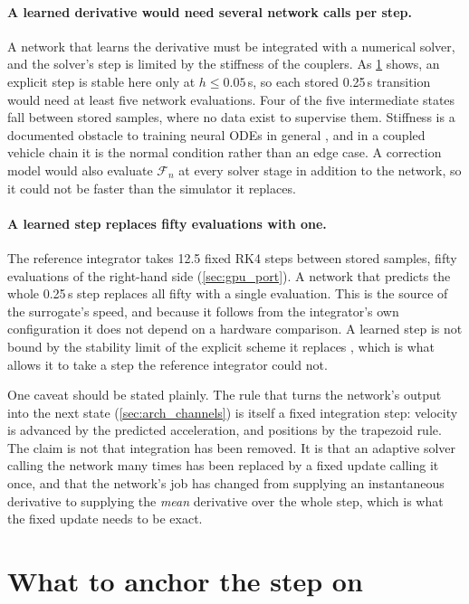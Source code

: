 \paragraph{A learned derivative would need several network calls per step.} A network that learns the derivative must be integrated with a numerical solver, and the solver's step is limited by the stiffness of the couplers. As \cref{sec:arch_anchor} shows, an explicit step is stable here only at $h \le 0.05$\,s, so each stored 0.25\,s transition would need at least five network evaluations. Four of the five intermediate states fall between stored samples, where no data exist to supervise them. Stiffness is a documented obstacle to training neural ODEs in general \cite{kim2021stiffneuralode}, and in a coupled vehicle chain it is the normal condition rather than an edge case. A correction model would also evaluate $\mathcal{F}_n$ at every solver stage in addition to the network, so it could not be faster than the simulator it replaces.

\paragraph{A learned step replaces fifty evaluations with one.} The reference integrator takes 12.5 fixed RK4 steps between stored samples, fifty evaluations of the right-hand side (\cref{sec:gpu_port}). A network that predicts the whole 0.25\,s step replaces all fifty with a single evaluation. This is the source of the surrogate's speed, and because it follows from the integrator's own configuration it does not depend on a hardware comparison. A learned step is not bound by the stability limit of the explicit scheme it replaces \cite{stachenfeld2022coarse}, which is what allows it to take a step the reference integrator could not.

One caveat should be stated plainly. The rule that turns the network's output into the next state (\cref{sec:arch_channels}) is itself a fixed integration step: velocity is advanced by the predicted acceleration, and positions by the trapezoid rule. The claim is not that integration has been removed. It is that an adaptive solver calling the network many times has been replaced by a fixed update calling it once, and that the network's job has changed from supplying an instantaneous derivative to supplying the \emph{mean} derivative over the whole step, which is what the fixed update needs to be exact.

\section{What to anchor the step on}
\label{sec:arch_anchor}


